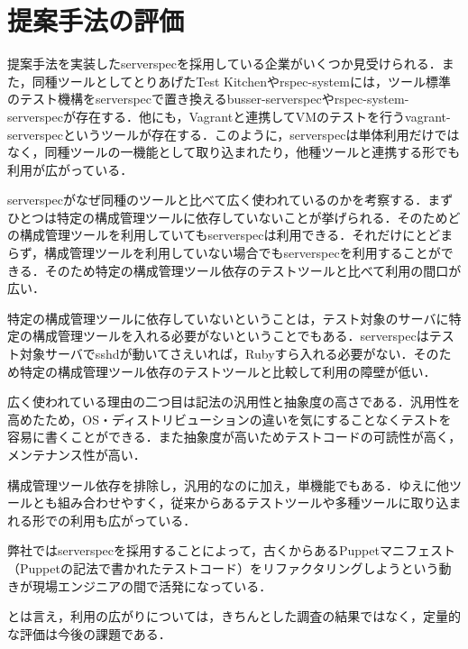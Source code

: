 \section{提案手法の評価}

提案手法を実装したserverspecを採用している企業がいくつか見受けられる．また，同種ツールとしてとりあげたTest Kitchenやrspec-systemには，ツール標準のテスト機構をserverspecで置き換えるbusser-serverspecやrspec-system-serverspecが存在する．他にも，Vagrantと連携してVMのテストを行うvagrant-serverspecというツールが存在する．このように，serverspecは単体利用だけではなく，同種ツールの一機能として取り込まれたり，他種ツールと連携する形でも利用が広がっている．

serverspecがなぜ同種のツールと比べて広く使われているのかを考察する．まずひとつは特定の構成管理ツールに依存していないことが挙げられる．そのためどの構成管理ツールを利用していてもserverspecは利用できる．それだけにとどまらず，構成管理ツールを利用していない場合でもserverspecを利用することができる．そのため特定の構成管理ツール依存のテストツールと比べて利用の間口が広い．

特定の構成管理ツールに依存していないということは，テスト対象のサーバに特定の構成管理ツールを入れる必要がないということでもある．serverspecはテスト対象サーバでsshdが動いてさえいれば，Rubyすら入れる必要がない．そのため特定の構成管理ツール依存のテストツールと比較して利用の障壁が低い．

広く使われている理由の二つ目は記法の汎用性と抽象度の高さである．汎用性を高めたため，OS・ディストリビューションの違いを気にすることなくテストを容易に書くことができる．また抽象度が高いためテストコードの可読性が高く，メンテナンス性が高い．

構成管理ツール依存を排除し，汎用的なのに加え，単機能でもある．ゆえに他ツールとも組み合わせやすく，従来からあるテストツールや多種ツールに取り込まれる形での利用も広がっている．

弊社ではserverspecを採用することによって，古くからあるPuppetマニフェスト（Puppetの記法で書かれたテストコード）をリファクタリングしようという動きが現場エンジニアの間で活発になっている．

とは言え，利用の広がりについては，きちんとした調査の結果ではなく，定量的な評価は今後の課題である．
